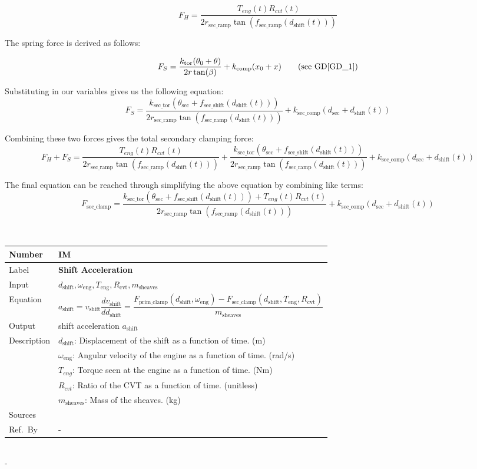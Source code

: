 \documentclass[12pt]{article}
\newcommand{\colAwidth}{0.13\textwidth}
\newcommand{\colBwidth}{0.82\textwidth}
\newcommand{\dref}[1]{GD\ref{#1}}
\newcounter{instnum} %
\newcommand{\definstance}[7] {
~\newline
\noindent
\begin{minipage}{\textwidth}
\renewcommand*{\arraystretch}{1.5}
\begin{tabular}{| p{\colAwidth} | p{\colBwidth}|}
  \hline
  \rowcolor[gray]{0.9}
  Number& IM\refstepcounter{instnum}\theinstnum \label{inst:\theinstnum}\\
  \hline
  Label& \bf #1 \\
  \hline
  Input& #2\\
  \hline
  Equation& #3\\
  \hline
  Output& #4\\
  \hline
  Description& #5 \\
  \hline
  Sources& #6 \\
  \hline
  Ref.\ By & #7\\
  \hline
\end{tabular}
\end{minipage}\\
}
\begin{document}
\[
F_H = \frac{T_{eng}(t) R_{cvt}(t)}{2 r_{\text{sec\_ramp}} \tan(f_{\text{sec\_ramp}}(d_\text{shift}(t)))}
\]

The spring force is derived as follows:

\[
F_S = \frac{k_{\text{tor}}(\theta_0 + \theta)}{2r\tan(\beta)} + k_\text{comp}(x_0 + x) \tag*{\text{(see \dref{GD_1})}} %
\]

Substituting in our variables gives us the following equation:
\[
F_S = \frac{k_{\text{sec\_tor}} (\theta_{\text{sec}} + f_{\text{sec\_shift}}(d_\text{shift}(t)))}{2 r_{\text{sec\_ramp}} \tan(f_{\text{sec\_ramp}}(d_\text{shift}(t)))} + k_{\text{sec\_comp}} (d_{\text{sec}} + d_\text{shift}(t))
\]

Combining these two forces gives the total secondary clamping force:
\[
F_H + F_S = \frac{T_{eng}(t) R_{cvt}(t)}{2 r_{\text{sec\_ramp}} \tan(f_{\text{sec\_ramp}}(d_\text{shift}(t)))} + \frac{k_{\text{sec\_tor}} (\theta_{\text{sec}} + f_{\text{sec\_shift}}(d_\text{shift}(t)))}{2 r_{\text{sec\_ramp}} \tan(f_{\text{sec\_ramp}}(d_\text{shift}(t)))} + k_{\text{sec\_comp}} (d_{\text{sec}} + d_\text{shift}(t))
\]

The final equation can be reached through simplifying the above equation by combining like terms:
\[
F_{\text{sec\_clamp}} = \frac{k_{\text{sec\_tor}} (\theta_{\text{sec}} + f_{\text{sec\_shift}}(d_\text{shift}(t))) + T_{eng}(t) R_{cvt}(t)}{2 r_{\text{sec\_ramp}} \tan(f_{\text{sec\_ramp}}(d_\text{shift}(t)))} + k_{\text{sec\_comp}} (d_{\text{sec}} + d_\text{shift}(t))
\]

\definstance
{Shift Acceleration}
{$d_\text{shift}, \omega_\text{eng}, T_\text{eng}, R_\text{cvt}, m_\text{sheaves}$} %
{\[
a_\text{shift} = v_\text{shift}\frac{dv_\text{shift}}{dd_\text{shift}} = \frac{F_{\text{prim\_clamp}}(d_\text{shift}, \omega_\text{eng}) - F_{\text{sec\_clamp}}(d_\text{shift}, T_\text{eng}, R_\text{cvt})}{m_\text{sheaves}}
\]} %
{shift acceleration $a_\text{shift}$} %
{
  $d_\text{shift}$: Displacement of the shift as a function of time. (m)\\
  &$\omega_\text{eng}$: Angular velocity of the engine as a function of time. (rad/s)\\
  &$T_{eng}$: Torque seen at the engine as a function of time. (Nm) \\
  &$R_{cvt}$: Ratio of the CVT as a function of time. (unitless) \\
  &$m_\text{sheaves}$: Mass of the sheaves. (kg)
} %
{} %
{-}
{} %
{} %
{-}
\end{document}
